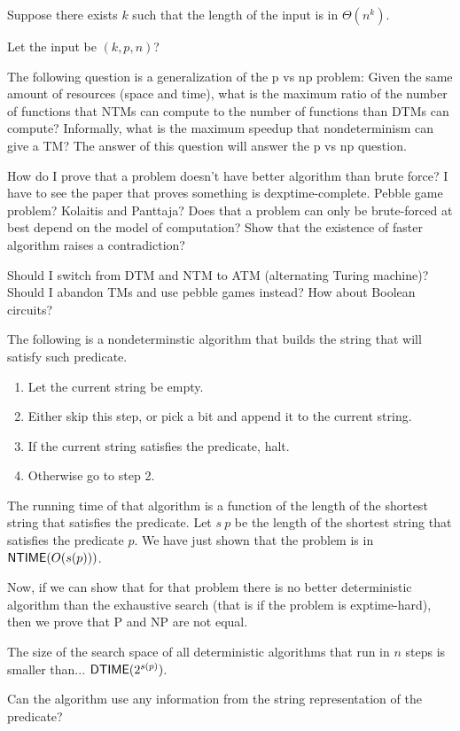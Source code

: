 Suppose there exists $k$ such that the length of the input is in $\Theta(n^k)$.

Let the input be $(k,p,n)$?

The following question is a generalization of the p vs np problem:
Given the same amount of resources (space and time),
what is the maximum ratio of the number of functions that NTMs can compute
to the number of functions than DTMs can compute?
Informally, what is the maximum speedup
that nondeterminism can give a TM?
The answer of this question will answer the p vs np question.

How do I prove that a problem doesn't have better algorithm than brute force?
I have to see the paper that proves something is dexptime-complete.
Pebble game problem? Kolaitis and Panttaja?
Does that a problem can only be brute-forced at best
depend on the model of computation?
Show that the existence of faster algorithm raises a contradiction?

Should I switch from DTM and NTM to ATM (alternating Turing machine)?
Should I abandon TMs and use pebble games instead?
How about Boolean circuits?

The following is a nondeterminstic algorithm that
builds the string that will satisfy such predicate.
\begin{enumerate}
\item Let the current string be empty.
\item Either skip this step,
or pick a bit and append it to the current string.
\item If the current string satisfies the predicate, halt.
\item Otherwise go to step 2.
\end{enumerate}
The running time of that algorithm is a function of the length
of the shortest string that satisfies the predicate.
Let $s~p$ be the length of the shortest string that satisfies the predicate $p$.
We have just shown that the problem is in $\operatorname{\mathsf{NTIME}}(O(s(p)))$.

Now, if we can show that for that problem
there is no better deterministic algorithm than the exhaustive search
(that is if the problem is exptime-hard),
then we prove that P and NP are not equal.

The size of the search space of all deterministic algorithms
that run in $n$ steps is smaller than...
$\operatorname{\mathsf{DTIME}}(2^{s(p)})$.

Can the algorithm use any information from
the string representation of the predicate?

